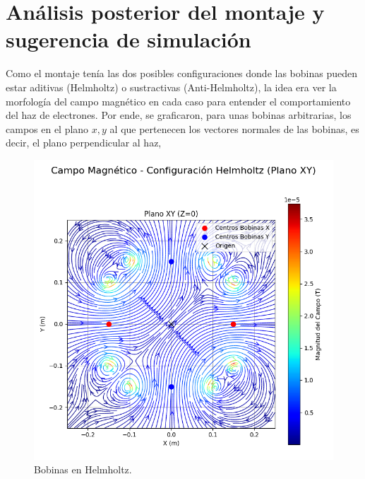 \section{Análisis posterior del montaje y sugerencia de simulación}

Como el montaje tenía las dos posibles configuraciones donde las bobinas pueden
estar aditivas (Helmholtz) o sustractivas (Anti-Helmholtz), la
idea era ver la morfología del campo magnético en cada caso para entender el
comportamiento del haz de electrones. Por ende, se graficaron, para unas bobinas
arbitrarias, los campos en el plano $x,y$ al que pertenecen los vectores
normales de las bobinas, es decir, el plano perpendicular al haz,

\begin{figure}[H]
    \centering
    \begin{minipage}[b]{0.48\textwidth}
        \includegraphics[width=\linewidth]{Sections/Figures/helmholtz_xy_field.png}
        \caption{Bobinas en  Helmholtz.}
        \label{fig:helmholtz_xy_field}
    \end{minipage}
    \hfill
    \begin{minipage}[b]{0.48\textwidth}

\end{minipage}
\end{figure}
